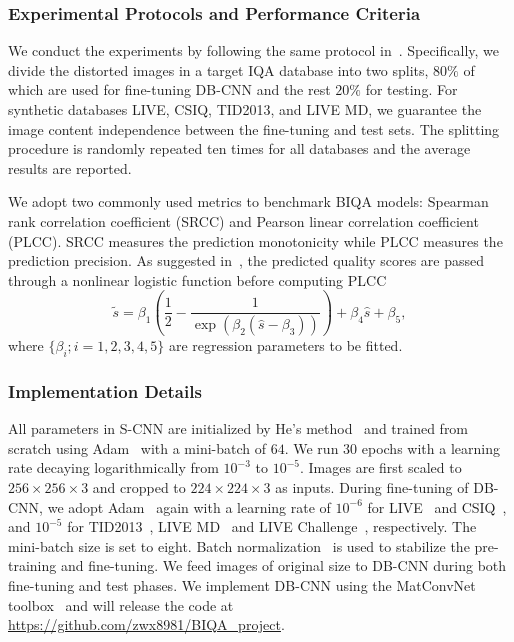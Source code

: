 \documentclass[journal]{IEEEtran}
\begin{document}
\subsubsection{Experimental Protocols and Performance Criteria}\label{subsec:expprotocol}
We conduct the experiments by following the same protocol in~\cite{kim2017deep}. Specifically, we divide the distorted images in a target IQA database into two splits, $80\%$ of which are used for fine-tuning  DB-CNN and the rest $20\%$ for testing. For synthetic databases LIVE, CSIQ, TID2013, and LIVE MD, we guarantee the image content independence between the fine-tuning and test sets. The splitting procedure is randomly repeated ten times for all databases and the average results are reported.

We adopt two commonly used metrics to benchmark BIQA models: Spearman rank correlation coefficient (SRCC) and Pearson linear correlation coefficient (PLCC). SRCC measures the prediction monotonicity while PLCC measures the prediction precision. As suggested in~\cite{video2003final}, the predicted quality scores are passed through a nonlinear logistic function before computing PLCC
\begin{equation}\label{eq:logistic}
\tilde{s} = \beta_{1}\left(\frac{1}{2}-\frac{1}{\exp(\beta_{2}(\hat{s}-\beta_{3}))}\right)+\beta_{4}\hat{s}+\beta_{5},
\end{equation}
where $\{\beta_{i}; i=1,2,3,4,5\}$ are regression parameters to be fitted.

\subsubsection{Implementation Details}\label{subsec:impldetail}
All parameters in S-CNN are initialized by He's method~\cite{he2015delving} and trained from scratch using Adam~\cite{Kingma2014adam} with a mini-batch of $64$.  We run $30$ epochs with a learning rate decaying logarithmically from $10^{-3}$ to $10^{-5}$. Images are first scaled to $256 \times 256 \times 3$ and cropped to $224 \times 224 \times 3$ as inputs. During fine-tuning of DB-CNN, we adopt Adam~\cite{Kingma2014adam} again with a learning rate of $10^{-6}$ for LIVE~\cite{sheikh2006statistical} and CSIQ~\cite{larson2010most}, and $10^{-5}$ for TID2013~\cite{ponomarenko2013color}, LIVE MD~\cite{Jayaraman2013Objective} and LIVE Challenge~\cite{ghadiyaram2016massive}, respectively. The mini-batch size is set to eight. Batch normalization~\cite{ioffe2015batch} is used to stabilize the pre-training and fine-tuning.
We feed images of original size to DB-CNN during both fine-tuning and test phases. We implement DB-CNN using the MatConvNet toolbox~\cite{vedaldi2015matconvnet} and will release the code at \url{https://github.com/zwx8981/BIQA_project}.
\end{document}

